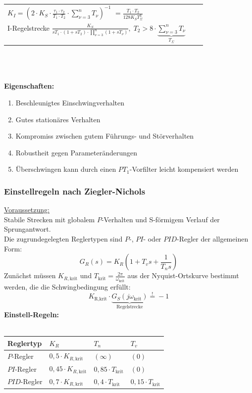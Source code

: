 \documentclass[a4paper,twocolumn,10pt]{article}
\newcommand{\sollsein}{\stackrel{!}{=}}
\begin{document}
{\begin{tabular}{|l|l|l|}
{{				$K_I=\left(2\cdot K_S\cdot\frac{\tau_1\cdot\tau_2}{T_1\cdot T_2}\cdot\sum\limits_{\nu=3}^nT_{\nu}\right)^{-1}$\\
				$=\frac{T_1\cdot T_2}{128K_ST_{\Sigma}^3}$
			}
		}\\
		\cline{1-1}
		\pbox{\columnwidth}{
			\vspace{0.2cm}
			I-Regelstrecke\\\\
			$\frac{K_S}{sT_1\cdot(1+sT_2)\cdot\prod\limits_{\nu=3}^n(1+sT_{\nu})},\;T_2>8\cdot\underbrace{\sum\limits_{\nu=3}^nT_{\nu}}_{T_{\Sigma}}$
		}
		& & \\
		\hline
\end{tabular}
}\\\\\\
\textbf{Eigenschaften:}
\begin{enumerate}[label=$\bullet$]
\item Beschleunigtes Einschwingverhalten
\item Gutes stationäres Verhalten
\item Kompromiss zwischen gutem Führungs- und Störverhalten
\item Robustheit gegen Parameteränderungen
\item Überschwingen kann durch einen $PT_1$-Vorfilter leicht kompensiert werden
\end{enumerate}

\subsubsection{Einstellregeln nach Ziegler-Nichols}
\underline{Voraussetzung:}\\
Stabile Strecken mit globalem $P$-Verhalten und S-förmigem Verlauf der Sprungantwort.\\
Die zugrundegelegten Reglertypen sind $P$-, $PI$- oder $PID$-Regler der allgemeinen Form:
\begin{equation*}
G_R(s)=K_R\left(1+T_vs+\frac{1}{T_ns}\right)
\end{equation*}
Zunächst müssen $K_{R,\text{krit}}$ und $T_\text{krit}=\frac{2\pi}{\omega_{\text{krit}}}$ aus der Nyquist-Ortskurve bestimmt werden, die die Schwingbedingung erfüllt:
\begin{equation*}
K_\text{R,krit}\cdot \underbrace{G_S(j\omega_{\text{krit}})}_{\text{Regelstrecke}}\sollsein -1
\end{equation*}
\textbf{Einstell-Regeln:}\\\\
\begin{tabular}{|l|l|l|l|}
\hline
Reglertyp & $K_R$ & $T_n$ & $T_v$\\
\hline
$P$-Regler & $0,5\cdot K_{R,\text{krit}}$ & $(\infty)$ & $(0)$\\
\hline
$PI$-Regler & $0,45\cdot K_{R,\text{krit}}$ & $0,85\cdot T_{\text{krit}}$ & $(0)$\\
\hline
$PID$-Regler & $0,7\cdot K_{R,\text{krit}}$ & $0,4\cdot T_{\text{krit}}$ & $0,15\cdot T_{\text{krit}}$\\
\hline
\end{tabular}
\end{document}
